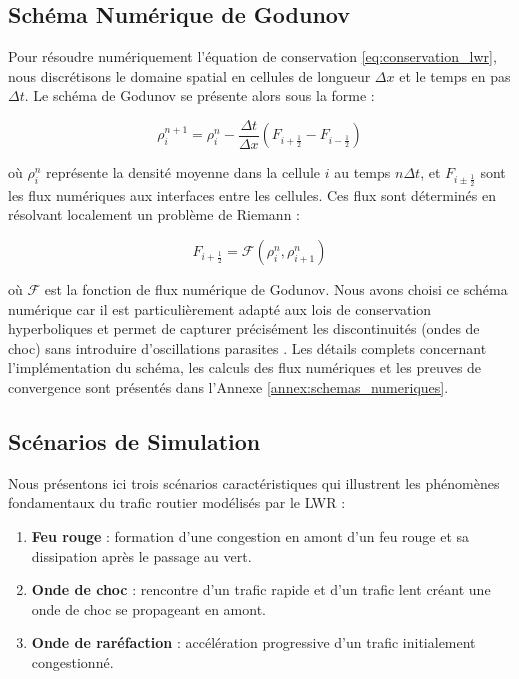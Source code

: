 \subsection{Schéma Numérique de Godunov}
\label{subsec:godunov}

Pour résoudre numériquement l'équation de conservation \eqref{eq:conservation_lwr}, nous discrétisons le domaine spatial en cellules de longueur $\Delta x$ et le temps en pas $\Delta t$. Le schéma de Godunov \cite{godunov1959finite,leveque1992numerical} se présente alors sous la forme :

\begin{equation}
\rho_i^{n+1} = \rho_i^n - \frac{\Delta t}{\Delta x}(F_{i+\frac{1}{2}} - F_{i-\frac{1}{2}})
\end{equation}

où $\rho_i^n$ représente la densité moyenne dans la cellule $i$ au temps $n\Delta t$, et $F_{i\pm\frac{1}{2}}$ sont les flux numériques aux interfaces entre les cellules. Ces flux sont déterminés en résolvant localement un problème de Riemann :

\begin{equation}
    F_{i+\frac{1}{2}} = \mathcal{F}(\rho_i^n, \rho_{i+1}^n)
\end{equation}
    
où $\mathcal{F}$ est la fonction de flux numérique de Godunov. Nous avons choisi ce schéma numérique car il est particulièrement adapté aux lois de conservation hyperboliques et permet de capturer précisément les discontinuités (ondes de choc) sans introduire d'oscillations parasites \cite{toro2013riemann}. Les détails complets concernant l'implémentation du schéma, les calculs des flux numériques et les preuves de convergence sont présentés dans l'Annexe \ref{annex:schemas_numeriques}.
    
\subsection{Scénarios de Simulation}
\label{subsec:scenarios}

Nous présentons ici trois scénarios caractéristiques qui illustrent les phénomènes fondamentaux du trafic routier modélisés par le LWR :

\begin{enumerate}
    \item \textbf{Feu rouge} : formation d'une congestion en amont d'un feu rouge et sa dissipation après le passage au vert.
    \item \textbf{Onde de choc} : rencontre d'un trafic rapide et d'un trafic lent créant une onde de choc se propageant en amont.
    \item \textbf{Onde de raréfaction} : accélération progressive d'un trafic initialement congestionné.
\end{enumerate}

